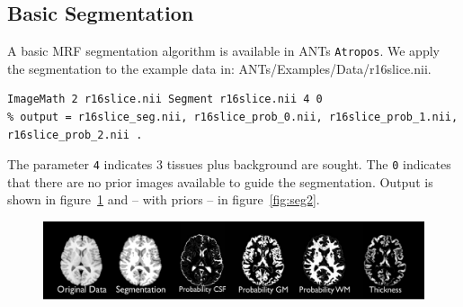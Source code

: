 \documentclass{InsightArticle}
\begin{document}
\subsection{Basic Segmentation}
A basic MRF segmentation algorithm is available in ANTs \texttt{Atropos}.  We apply 
the segmentation to the example data in: ANTs/Examples/Data/r16slice.nii.  
\begin{verbatim}
ImageMath 2 r16slice.nii Segment r16slice.nii 4 0 
% output = r16slice_seg.nii, r16slice_prob_0.nii, r16slice_prob_1.nii, r16slice_prob_2.nii .  
\end{verbatim}
The parameter \texttt{4} indicates 3 tissues plus background are sought.  The \texttt{0} indicates 
that there are no prior images available to guide the segmentation.  Output is shown 
in figure~\ref{fig:seg} and -- with priors -- in figure~\ref{fig:seg2}.
\begin{figure}
\includegraphics[width=1\textwidth]{Figures/segmentation.pdf} 
\label{fig:seg}
\end{figure}
\end{document}
